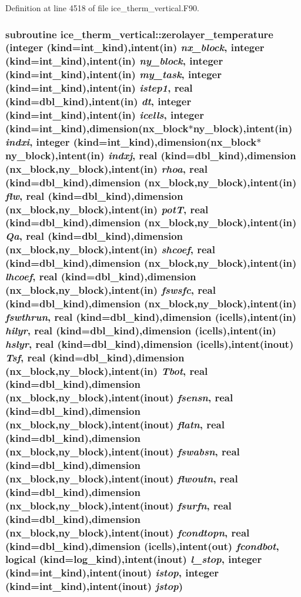 Definition at line 4518 of file ice\_\-therm\_\-vertical.F90.\hypertarget{namespaceice__therm__vertical_a862eb3ec0eaa2a5ae48961730e1ba7ce}{
\subsubsection[{zerolayer\_\-temperature}]{\setlength{\rightskip}{0pt plus 5cm}subroutine ice\_\-therm\_\-vertical::zerolayer\_\-temperature (integer (kind=int\_\-kind),intent(in) {\em nx\_\-block}, \/  integer (kind=int\_\-kind),intent(in) {\em ny\_\-block}, \/  integer (kind=int\_\-kind),intent(in) {\em my\_\-task}, \/  integer (kind=int\_\-kind),intent(in) {\em istep1}, \/  real (kind=dbl\_\-kind),intent(in) {\em dt}, \/  integer (kind=int\_\-kind),intent(in) {\em icells}, \/  integer (kind=int\_\-kind),dimension(nx\_\-block$\ast$ny\_\-block),intent(in) {\em indxi}, \/  integer (kind=int\_\-kind),dimension(nx\_\-block$\ast$ny\_\-block),intent(in) {\em indxj}, \/  real (kind=dbl\_\-kind),dimension (nx\_\-block,ny\_\-block),intent(in) {\em rhoa}, \/  real (kind=dbl\_\-kind),dimension (nx\_\-block,ny\_\-block),intent(in) {\em flw}, \/  real (kind=dbl\_\-kind),dimension (nx\_\-block,ny\_\-block),intent(in) {\em potT}, \/  real (kind=dbl\_\-kind),dimension (nx\_\-block,ny\_\-block),intent(in) {\em Qa}, \/  real (kind=dbl\_\-kind),dimension (nx\_\-block,ny\_\-block),intent(in) {\em shcoef}, \/  real (kind=dbl\_\-kind),dimension (nx\_\-block,ny\_\-block),intent(in) {\em lhcoef}, \/  real (kind=dbl\_\-kind),dimension (nx\_\-block,ny\_\-block),intent(in) {\em fswsfc}, \/  real (kind=dbl\_\-kind),dimension (nx\_\-block,ny\_\-block),intent(in) {\em fswthrun}, \/  real (kind=dbl\_\-kind),dimension (icells),intent(in) {\em hilyr}, \/  real (kind=dbl\_\-kind),dimension (icells),intent(in) {\em hslyr}, \/  real (kind=dbl\_\-kind),dimension (icells),intent(inout) {\em Tsf}, \/  real (kind=dbl\_\-kind),dimension (nx\_\-block,ny\_\-block),intent(in) {\em Tbot}, \/  real (kind=dbl\_\-kind),dimension (nx\_\-block,ny\_\-block),intent(inout) {\em fsensn}, \/  real (kind=dbl\_\-kind),dimension (nx\_\-block,ny\_\-block),intent(inout) {\em flatn}, \/  real (kind=dbl\_\-kind),dimension (nx\_\-block,ny\_\-block),intent(inout) {\em fswabsn}, \/  real (kind=dbl\_\-kind),dimension (nx\_\-block,ny\_\-block),intent(inout) {\em flwoutn}, \/  real (kind=dbl\_\-kind),dimension (nx\_\-block,ny\_\-block),intent(inout) {\em fsurfn}, \/  real (kind=dbl\_\-kind),dimension (nx\_\-block,ny\_\-block),intent(inout) {\em fcondtopn}, \/  real (kind=dbl\_\-kind),dimension (icells),intent(out) {\em fcondbot}, \/  logical (kind=log\_\-kind),intent(inout) {\em l\_\-stop}, \/  integer (kind=int\_\-kind),intent(inout) {\em istop}, \/  integer (kind=int\_\-kind),intent(inout) {\em jstop})}}
\label{namespaceice__therm__vertical_a862eb3ec0eaa2a5ae48961730e1ba7ce}


